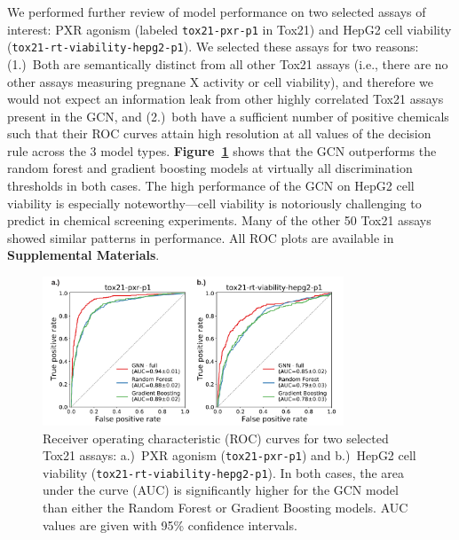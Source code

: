\documentclass{ws-procs11x85}
\begin{document}
We performed further review of model performance on two selected assays of interest: PXR agonism (labeled \texttt{tox21-pxr-p1} in Tox21) and HepG2 cell viability (\texttt{tox21-rt-viability-hepg2-p1}).
We selected these assays for two reasons: (1.)~Both are semantically distinct from all other Tox21 assays (i.e., there are no other assays measuring pregnane X activity or cell viability), and therefore we would not expect an information leak from other highly correlated Tox21 assays present in the GCN, and (2.)~both have a sufficient number of positive chemicals such that their ROC curves attain high resolution at all values of the decision rule across the 3 model types.
\textbf{Figure~\ref{fig:4}} shows that the GCN outperforms the random forest and gradient boosting models at virtually all discrimination thresholds in both cases. 
The high performance of the GCN on HepG2 cell viability is especially noteworthy---cell viability is notoriously challenging to predict in chemical screening experiments.
Many of the other 50 Tox21 assays showed similar patterns in performance.
All ROC plots are available in \textbf{Supplemental Materials}.

\begin{figure}
   \centering
   \includegraphics[width=0.8\textwidth]{figures/figure4.pdf}
   \caption{Receiver operating characteristic (ROC) curves for two selected Tox21 assays: a.)~PXR agonism (\texttt{tox21-pxr-p1}) and b.)~HepG2 cell viability (\texttt{tox21-rt-viability-hepg2-p1}). In both cases, the area under the curve (AUC) is significantly higher for the GCN model than either the Random Forest or Gradient Boosting models. AUC values are given with 95\% confidence intervals.}\label{fig:4}
\end{figure}
\end{document}
